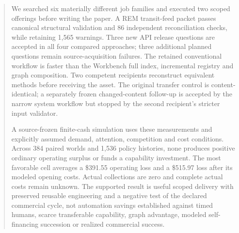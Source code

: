 \begin{abstract}
We searched six materially different job families and executed two scoped offerings before
writing the paper. A REM transit-feed packet passes canonical structural validation and 86
independent reconciliation checks, while retaining 1,565 warnings. Three new API release
questions are accepted in all four compared approaches; three additional planned questions
remain source-acquisition failures. The retained conventional workflow is faster than the
Workbench full index, incremental registry and graph composition. Two competent recipients
reconstruct equivalent methods before receiving the asset. The original transfer control is
content-identical; a separately frozen changed-content follow-up is accepted by the narrow
system workflow but stopped by the second recipient's stricter input validator.

A source-frozen finite-cash simulation uses these measurements and explicitly assumed demand,
attention, competition and cost conditions. Across 384 paired worlds and 1,536 policy histories,
none produces positive ordinary operating surplus or funds a capability investment. The most
favorable cell averages a \$391.55 operating loss and a \$515.97 loss after its modeled opening
costs. Actual collections are zero and complete actual costs remain unknown. The supported
result is useful scoped delivery with preserved reusable engineering and a negative test of
the declared commercial cycle, not automation savings established against timed humans,
scarce transferable capability, graph advantage, modeled self-financing succession or realized
commercial success.
\end{abstract}
